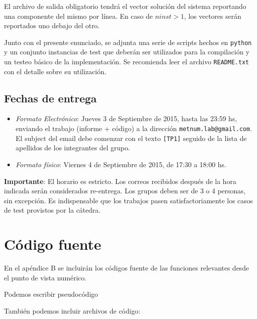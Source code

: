 \documentclass[11pt, a4paper, spanish]{article}
\let\strong\textbf
\theoremstyle{plain}
\theoremstyle{remark}
\begin{document}
\begin{appendices}
      El archivo de salida obligatorio tendrá el vector solución del sistema reportando una componente del mismo por línea. En caso de $ninst > 1$, los vectores serán reportados uno debajo del otro.

      Junto con el presente enunciado, se adjunta una serie de scripts hechos en \texttt{python} y un conjunto instancias de test que deberán ser utilizados para la compilación y un testeo básico de la implementación. Se recomienda leer el archivo \texttt{README.txt} con el detalle sobre su utilización.

    \subsection{Fechas de entrega}
      \begin{itemize}
        \item \emph{Formato Electrónico}: Jueves 3 de Septiembre de 2015, hasta las 23:59 hs, enviando el trabajo (informe + código) a la dirección \texttt{metnum.lab@gmail.com}. El subject del email debe comenzar con el texto \texttt{[TP1]} seguido de la lista de apellidos de los integrantes del grupo.
        \item \emph{Formato físico}: Viernes 4 de Septiembre de 2015, de 17:30 a 18:00 hs.
      \end{itemize}

      \strong{Importante}: El horario es estricto. Los correos recibidos después de la hora indicada serán considerados re-entrega. Los grupos deben ser de 3 o 4 personas, sin excepción. Es indispensable que los trabajos pasen satisfactoriamente los casos de test provistos por la cátedra.

  \newpage
  \section{Código fuente}

    En el apéndice B se incluirán los códigos fuente de las funciones relevantes desde el punto de vista numérico.

    \begin{algorithm}
      \caption{Podemos escribir pseudocódigo}
    \end{algorithm}

    También podemos incluir archivos de código:
    

  \newpage

\end{appendices}
\end{document}
